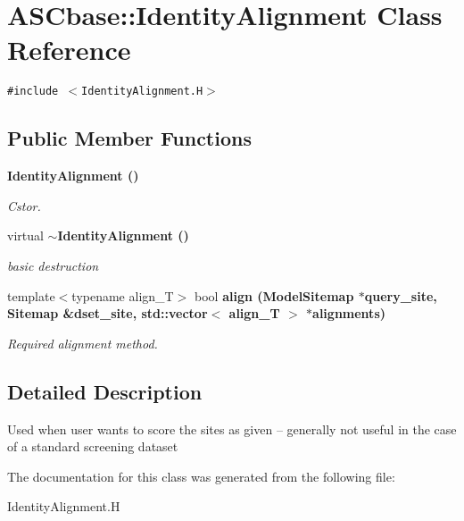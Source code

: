 \section{ASCbase::Identity\-Alignment Class Reference}
\label{classASCbase_1_1IdentityAlignment}
{\tt \#include $<$Identity\-Alignment.H$>$}

\subsection*{Public Member Functions}
\begin{CompactItemize}
\item 
\bf{Identity\-Alignment} ()\label{classASCbase_1_1IdentityAlignment_797fcc9db55bc0f73d3c07355627983f}

\begin{CompactList}\small\item\em Cstor. \item\end{CompactList}\item 
virtual \bf{$\sim$Identity\-Alignment} ()\label{classASCbase_1_1IdentityAlignment_2fb1a7e4efddaba4b1c392884aab7782}

\begin{CompactList}\small\item\em basic destruction \item\end{CompactList}\item 
template$<$typename align\_\-T$>$ bool \bf{align} (\bf{Model\-Sitemap} $\ast$query\_\-site, \bf{Sitemap} \&dset\_\-site, std::vector$<$ align\_\-T $>$ $\ast$alignments)\label{classASCbase_1_1IdentityAlignment_3ac828753736d937a23ff2f92394ecc3}

\begin{CompactList}\small\item\em Required alignment method. \item\end{CompactList}\end{CompactItemize}


\subsection{Detailed Description}
Used when user wants to score the sites as given -- generally not useful in the case of a standard screening dataset 



The documentation for this class was generated from the following file:\begin{CompactItemize}
\item 
Identity\-Alignment.H\end{CompactItemize}
